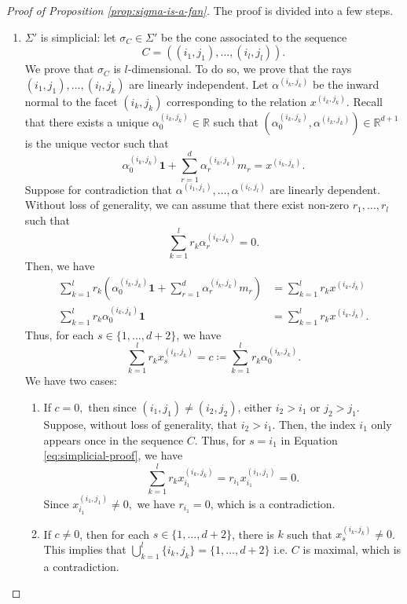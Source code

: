 \documentclass[11pt, reqno]{amsart}
\theoremstyle{plain}
\theoremstyle{definition}
\newcommand{\R}{\mathbb{R}}
\newcommand{\al}{\alpha}
\begin{document}
\begin{proof}[Proof of Proposition \ref{prop:sigma-is-a-fan}]
The proof is divided into a few steps.
\begin{enumerate}
    \item $\Sigma'$ is simplicial:
    let $\sigma_C \in \Sigma'$ be the cone associated to the sequence 
    \[
    C=((i_1,j_1), \dots, (i_l,j_l)).
    \]
    We prove that $\sigma_C$ is $l$-dimensional. To do so, we prove that the rays $(i_1,j_1),\dots,(i_l,j_k)$ are linearly independent.
    Let $\al^{(i_k,j_k)}$ be the inward normal to the facet $(i_k,j_k)$ corresponding to the relation $x^{(i_k,j_k)}$. Recall that there exists a unique $\al_0^{(i_k,j_k)} \in \R$ such that $(\al_0^{(i_k,j_k)}, \al^{(i_k,j_k)})\in \R^{d+1}$ is the unique vector such that 
    \[
    \al_0^{(i_k,j_k)} \mathbf{1} + \sum_{r=1}^{d} \al^{(i_k,j_k)}_rm_r = x^{(i_k,j_k)}.
    \]
    Suppose for contradiction that $\al^{(i_1,j_1)},\dots,\al^{(i_l,j_l)}$ are linearly dependent. Without loss of generality, we can assume that there exist non-zero $r_1,\dots,r_l$ such that
    \[
    \sum_{k=1}^{l} r_k \al_r^{(i_k,j_k)}=0.
    \]
    Then, we have
    \begin{align*}
         \sum_{k=1}^l r_k \left(\al_0^{(i_k,j_k)} \mathbf{1} + \sum_{r=1}^{d} \al^{(i_k,j_k)}_r m_r\right) &=  \sum_{k=1}^{l} r_kx^{(i_k,j_k)}\\
         \sum_{k=1}^l r_k \al_0^{(i_k,j_k)} \mathbf{1}&= \sum_{k=1}^{l} r_kx^{(i_k,j_k)}.
    \end{align*}
    Thus, for each $s \in \{1,\dots,d+2\}$, we have 
    \begin{equation}\label{eq:simplicial-proof}
        \sum_{k=1}^{l} r_kx^{(i_k,j_k)}_s = c \coloneqq \sum_{k=1}^l r_k \al_0^{(i_k,j_k)} .
    \end{equation}
    We have two cases:
    \begin{enumerate}
        \item If $c=0,$ then since $(i_1,j_1) \neq (i_2,j_2)$, either $i_2>i_1$ or $j_2>j_1$. Suppose, without loss of generality, that $i_2>i_1$. Then, the index $i_1$ only appears once in the sequence $C$.  Thus,
        for $s=i_1$ in Equation \eqref{eq:simplicial-proof}, we have 
        \[
        \sum_{k=1}^{l} r_kx^{(i_k,j_k)}_{i_1} =  r_{i_1} x^{(i_1,j_1)}_{i_1} = 0.
        \]
        Since $x^{(i_1,j_1)}_{i_1} \neq 0,$ we have $r_{i_1}=0$, which is a contradiction.
        \item If $c \neq 0$, then for each $s \in
         \{1 , \dots , d+2\}$, there is $k$ such that $x_s^{(i_k,j_k)} \neq 0$. This implies that $\bigcup_{k=1}^{l} \{i_k,j_k\} = \{1,\dots,d+2\}$ i.e. $C$ is maximal, which is a contradiction.

\end{enumerate}
\end{enumerate}
\end{proof}
\end{document}
